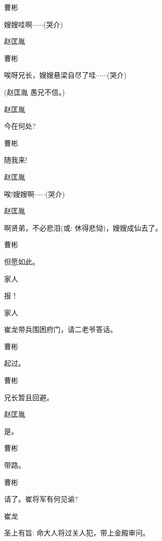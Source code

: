 {曹彬\hspace{30pt}~

嫂嫂哇啊$\cdots{}\cdots{}$(哭介)}

{赵匡胤\hspace{20pt}~

 }

{曹彬\hspace{30pt}~

唉呀兄长，嫂嫂悬梁自尽了哇$\cdots{}\cdots{}$(哭介)}

{(赵匡胤 愚兄不信。)}

{赵匡胤\hspace{20pt}~

今在何处?}

{曹彬\hspace{30pt}~

随我来!}

{赵匡胤\hspace{20pt}~

唉!嫂嫂啊$\cdots{}\cdots{}$(哭介)}

{赵匡胤\hspace{20pt}~

啊贤弟，不必悲泪({\akai 或}: 休得悲恸)，嫂嫂成仙去了。}

{曹彬\hspace{30pt}~

但愿如此。}

{家人\hspace{30pt}~

报！}

{家人\hspace{30pt}~

崔龙带兵围困府门，请二老爷答话。}

{曹彬\hspace{30pt}~

起过。}

{曹彬\hspace{30pt}~

兄长暂且回避。}

{赵匡胤\hspace{20pt}~

是。}

{曹彬\hspace{30pt}~

带路。}

{曹彬\hspace{30pt}~

请了。崔将军有何见谕?}

{崔龙\hspace{30pt}~

圣上有旨: 命大人将过关人犯，带上金殿审问。}


